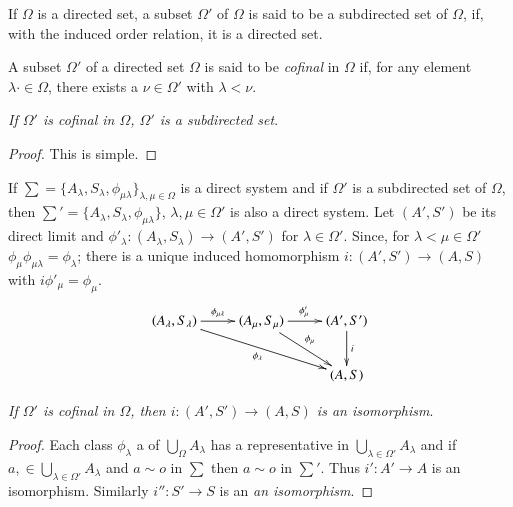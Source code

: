 \begin{defi*}
If $\Omega$ is a directed set, a subset $\Omega'$ of $\Omega$ is said
to be a subdirected set of $\Omega$, if, with the induced order
relation, it is a directed set. 
\end{defi*}

\begin{defi*}%
 A subset $\Omega'$ of a directed set $\Omega$ is said to be
 {\em{cofinal}} in $\Omega$ if, for any element $\lambda \cdot \in \Omega$,
 there exists a $\nu \in \Omega'$ with $\lambda < \nu$. 
\end{defi*}

\textit{If $\Omega'$ is cofinal in $\Omega$, $\Omega'$ is a
  subdirected set}. 

\begin{proof}
This is simple.
\end{proof}

If $\sum = \{ A_\lambda, S_\lambda, \phi_{\mu\lambda} \}_{\lambda,\mu
  \in \Omega}$ is a direct system and if $\Omega'$ is a subdirected
set of $\Omega$, then $\sum' = \{ A_\lambda, S_\lambda,
\phi_{\mu\lambda} \}$, $\lambda, \mu \in \Omega'$ is also a direct
system. Let $(A',S')$ be its direct limit and $\phi'_\lambda :
(A_\lambda, S_\lambda) \rightarrow (A', S')$ for $\lambda \in
\Omega'$. Since, for $\lambda < \mu \in \Omega'$ $\phi_\mu
\phi_{\mu\lambda} = \phi_\lambda$; there is a unique induced
homomorphism $i : (A',S') \rightarrow (A,S)$ with $i \phi'_\mu =
\phi_\mu$. 
\[
\xymatrix{
(A_{\lambda}, S_{\lambda})
  \ar[r]^{\phi_{\mu\lambda}}\ar[drr]_{\phi_{\lambda}} & (A_{\mu}, 
  S_{\mu}) \ar[r]^{\phi'_{\mu}} \ar[dr]^{\phi_{\mu}}&
  (A',S')\ar[d]^i\\
& & (A,S)
}
\]

\textit{If $\Omega'$ is cofinal in $\Omega$, then $ i : (A', S')
  \rightarrow (A,S)$ is an isomorphism}. 

\begin{proof}
Each class $\phi_\lambda$ a  of $\bigcup\limits_\Omega A_\lambda$ has a
representative in $\bigcup\limits_{\lambda \in \Omega'}A_\lambda$ and
if $a, \in \bigcup\limits_{\lambda \in \Omega'}A_\lambda$ and $a \sim
o$ in $\sum$ then $a \sim o$ in $\sum'$. Thus $i' : A' \rightarrow A$
is an isomorphism. Similarly $i'' : S' \rightarrow S$ is an {\em{an
    isomorphism}}. 
\end{proof}

